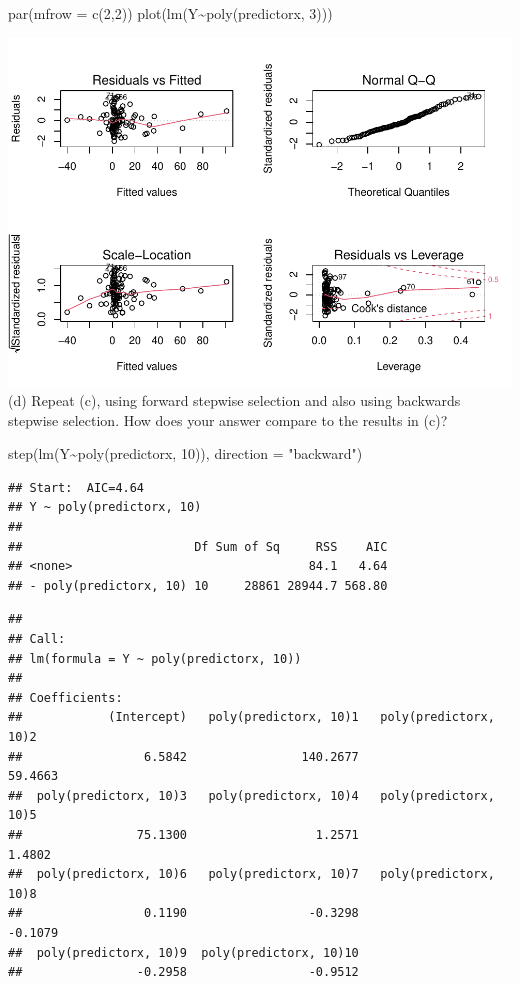 \documentclass[
]{article}
\newenvironment{Shaded}{\begin{snugshade}}{\end{snugshade}}
\newcommand{\AttributeTok}[1]{\textcolor[rgb]{0.77,0.63,0.00}{#1}}
\newcommand{\DecValTok}[1]{\textcolor[rgb]{0.00,0.00,0.81}{#1}}
\newcommand{\FunctionTok}[1]{\textcolor[rgb]{0.00,0.00,0.00}{#1}}
\newcommand{\NormalTok}[1]{#1}
\newcommand{\SpecialCharTok}[1]{\textcolor[rgb]{0.00,0.00,0.00}{#1}}
\newcommand{\StringTok}[1]{\textcolor[rgb]{0.31,0.60,0.02}{#1}}
\begin{document}
\begin{Shaded}
\begin{Highlighting}[]
\FunctionTok{par}\NormalTok{(}\AttributeTok{mfrow =} \FunctionTok{c}\NormalTok{(}\DecValTok{2}\NormalTok{,}\DecValTok{2}\NormalTok{))}
\FunctionTok{plot}\NormalTok{(}\FunctionTok{lm}\NormalTok{(Y}\SpecialCharTok{\textasciitilde{}}\FunctionTok{poly}\NormalTok{(predictorx, }\DecValTok{3}\NormalTok{)))}
\end{Highlighting}
\end{Shaded}

\includegraphics{math4322_fall21_hw2_files/figure-latex/unnamed-chunk-26-1.pdf}
(d) Repeat (c), using forward stepwise selection and also using
backwards stepwise selection. How does your answer compare to the
results in (c)?

\begin{Shaded}
\begin{Highlighting}[]
\FunctionTok{step}\NormalTok{(}\FunctionTok{lm}\NormalTok{(Y}\SpecialCharTok{\textasciitilde{}}\FunctionTok{poly}\NormalTok{(predictorx, }\DecValTok{10}\NormalTok{)), }\AttributeTok{direction =} \StringTok{"backward"}\NormalTok{)}
\end{Highlighting}
\end{Shaded}

\begin{verbatim}
## Start:  AIC=4.64
## Y ~ poly(predictorx, 10)
## 
##                        Df Sum of Sq     RSS    AIC
## <none>                                 84.1   4.64
## - poly(predictorx, 10) 10     28861 28944.7 568.80
\end{verbatim}

\begin{verbatim}
## 
## Call:
## lm(formula = Y ~ poly(predictorx, 10))
## 
## Coefficients:
##            (Intercept)   poly(predictorx, 10)1   poly(predictorx, 10)2  
##                 6.5842                140.2677                 59.4663  
##  poly(predictorx, 10)3   poly(predictorx, 10)4   poly(predictorx, 10)5  
##                75.1300                  1.2571                  1.4802  
##  poly(predictorx, 10)6   poly(predictorx, 10)7   poly(predictorx, 10)8  
##                 0.1190                 -0.3298                 -0.1079  
##  poly(predictorx, 10)9  poly(predictorx, 10)10  
##                -0.2958                 -0.9512
\end{verbatim}
\end{document}
